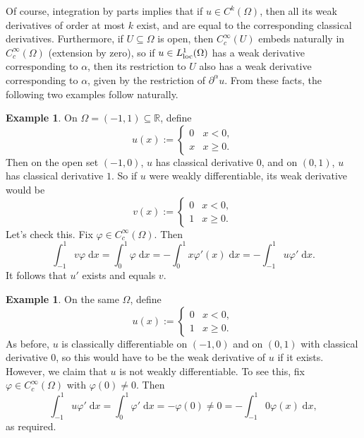 \documentclass{book}
\newcommand{\bbR}{\mathbb{R}}
\renewcommand{\d}{\mathrm{d}}
\renewcommand{\phi}{\varphi}
\theoremstyle{definition}
\newtheorem{example}[theorem]{Example}
\numberwithin{equation}{chapter}
\begin{document}
Of course, integration by parts implies that if $u \in C^k(\Omega)$, then all its weak derivatives of order at most $k$ exist, and are equal to the corresponding classical derivatives. Furthermore, if $U \subseteq \Omega$ is open, then $C_c^\infty(U)$ embeds naturally in $C_c^\infty(\Omega)$ (extension by zero), so if $u \in L^1_{\rm loc}(\Omega)$ has a weak derivative corresponding to $\alpha$, then its restriction to $U$ also has a weak derivative corresponding to $\alpha$, given by the restriction of $\partial^\alpha u$. From these facts, the following two examples follow naturally.
\begin{example}
    On $\Omega = (-1,1) \subseteq \bbR$, define 
    \begin{equation}
        u(x) := \begin{cases}
            0 & x < 0, \\
            x & x \geq 0.
        \end{cases}
    \end{equation}
    Then on the open set $(-1,0)$, $u$ has classical derivative $0$, and on $(0,1)$, $u$ has classical derivative $1$. So if $u$ were weakly differentiable, its weak derivative would be
    \begin{equation}
        v(x) := \begin{cases}
            0 & x < 0, \\
            1 & x \geq 0.
        \end{cases}
    \end{equation}
    Let's check this. Fix $\phi \in C_c^\infty(\Omega)$. Then 
    \begin{equation}
        \int_{-1}^1 v\phi \; \d{x} = \int_0^1 \phi \; \d{x} = - \int_0^1 x\phi'(x) \; \d{x} = - \int_{-1}^1 u\phi' \; \d{x}.
    \end{equation}
    It follows that $u'$ exists and equals $v$.
\end{example}
\begin{example}
    On the same $\Omega$, define
    \begin{equation}
        u(x) := \begin{cases}
            0 & x < 0, \\
            1 & x \geq 0.
        \end{cases}
    \end{equation}
    As before, $u$ is classically differentiable on $(-1,0)$ and on $(0,1)$ with classical derivative $0$, so this would have to be the weak derivative of $u$ if it exists. However, we claim that $u$ is not weakly differentiable. To see this, fix $\phi \in C_c^\infty(\Omega)$ with $\phi(0) \neq 0$. Then 
    \begin{equation}
        \int_{-1}^1 u\phi' \; \d{x} = \int_0^1 \phi' \; \d{x} = - \phi(0) \neq 0 = - \int_{-1}^1 0\phi(x) \; \d{x},
    \end{equation}
    as required.
\end{example}
\end{document}
